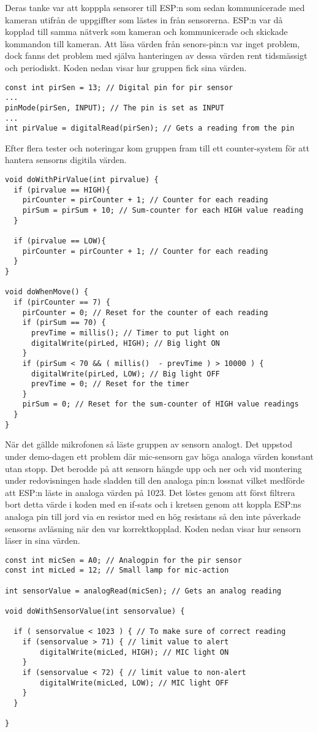 Deras tanke var att kopppla sensorer till ESP:n som sedan kommunicerade med kameran utifrån de uppgiffter som lästes in från sensorerna. ESP:n var då kopplad till samma nätverk som kameran och kommunicerade och skickade kommandon till kameran.
Att läsa värden från senors-pin:n var inget problem, dock fanns det problem med själva hanteringen av dessa värden rent tidsmässigt och periodiskt. Koden nedan visar hur gruppen fick sina värden.
\begin{lstlisting}
const int pirSen = 13; // Digital pin for pir sensor
...
pinMode(pirSen, INPUT); // The pin is set as INPUT
...
int pirValue = digitalRead(pirSen); // Gets a reading from the pin
\end{lstlisting}
Efter flera tester och noteringar kom gruppen fram till ett counter-system för att hantera sensorns digitila värden.
\begin{lstlisting}
void doWithPirValue(int pirvalue) {
  if (pirvalue == HIGH){
    pirCounter = pirCounter + 1; // Counter for each reading
    pirSum = pirSum + 10; // Sum-counter for each HIGH value reading
  }

  if (pirvalue == LOW){
    pirCounter = pirCounter + 1; // Counter for each reading
  }
}

void doWhenMove() {
  if (pirCounter == 7) {
    pirCounter = 0; // Reset for the counter of each reading
    if (pirSum == 70) {
      prevTime = millis(); // Timer to put light on
      digitalWrite(pirLed, HIGH); // Big light ON
    }
    if (pirSum < 70 && ( millis()  - prevTime ) > 10000 ) {
      digitalWrite(pirLed, LOW); // Big light OFF
      prevTime = 0; // Reset for the timer 
    }
    pirSum = 0; // Reset for the sum-counter of HIGH value readings
  }  
}
\end{lstlisting}
När det gällde mikrofonen så läste gruppen av sensorn analogt. Det uppstod under demo-dagen ett problem där mic-sensorn gav höga analoga värden konstant utan stopp. Det berodde på att sensorn hängde upp och ner och vid montering under redovisningen hade sladden till den analoga pin:n lossnat vilket medförde att ESP:n läste in analoga värden på 1023. Det löstes genom att först filtrera bort detta värde i koden med en if-sats och i kretsen genom att koppla ESP:ns analoga pin till jord via en resistor med en hög resistans så den inte påverkade sensorns avläsning när den var korrektkopplad. Koden nedan visar hur sensorn läser in sina värden.

\begin{lstlisting}
const int micSen = A0; // Analogpin for the pir sensor 
const int micLed = 12; // Small lamp for mic-action

int sensorValue = analogRead(micSen); // Gets an analog reading

void doWithSensorValue(int sensorvalue) {
  
  if ( sensorvalue < 1023 ) { // To make sure of correct reading
    if (sensorvalue > 71) { // limit value to alert
        digitalWrite(micLed, HIGH); // MIC light ON
    }
    if (sensorvalue < 72) { // limit value to non-alert
        digitalWrite(micLed, LOW); // MIC light OFF
    }
  }
  
}
\end{lstlisting}

